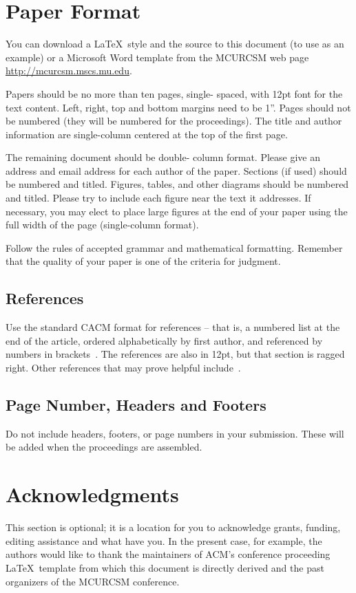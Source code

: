 \documentclass{mcurcsm}
\begin{document}
\balance

\section{Paper Format}
You can download a \LaTeX\ style and the source to this document (to use as an
example) or a Microsoft Word template 
from the MCURCSM  web page  
\url{http://mcurcsm.mscs.mu.edu}.
 
Papers should be no more than ten pages, single- spaced, with 12pt font
for the text content. Left, right, top and bottom margins need to be 1''.  Pages
should not be numbered (they will be numbered for the proceedings). The title
and author information are single-column centered at the top of the first page.   

The remaining document should be double- column format. Please give an address
and email address for each author of the paper. Sections (if used) should be
numbered and titled. Figures, tables, and other diagrams should be numbered and
titled. Please try to include each figure near the text it addresses. If
necessary, you may elect to place large figures at the end of your paper using
the full width of the page (single-column format). 

Follow the rules of accepted grammar and mathematical formatting. Remember that
the quality of your paper is one of the criteria for judgment. 

\subsection{References}
Use the standard CACM format for references -- that is, a numbered list at the
end of the article, ordered alphabetically by first author, and referenced by
numbers in brackets~\cite{bowman:reasoning}.  The references are also in 12pt,
but that section is ragged right.  Other references that may prove helpful
include~\cite{Dupre:1995:BW,Lamport:LaTeX,Mittelbach:2004:LC}.

\subsection{Page Number, Headers and Footers}
Do not include headers, footers, or page numbers in your submission.  These will
be added when the proceedings are assembled.

\section{Acknowledgments}
This section is optional; it is a location for you to acknowledge grants,
funding, editing assistance and what have you.  In the present case, for
example, the authors would like to thank the maintainers of ACM's conference
proceeding \LaTeX\ template from which this document is directly derived and the
past organizers of the MCURCSM conference.
\end{document}
